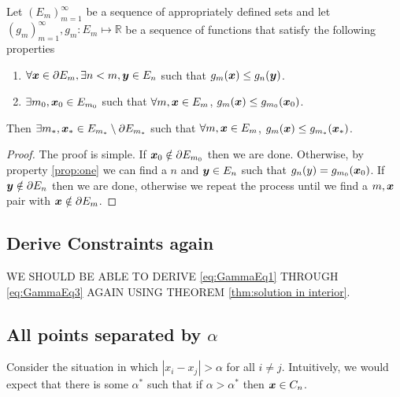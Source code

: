 		\begin{theorem}
			\label{thm:solution in interior}
			Let $(E_m)_{m=1}^\infty$ be a sequence of appropriately defined sets and let
			$(g_m)_{m=1}^\infty, g_m: E_m \mapsto \mathbb{R}$ be a sequence of
			functions that satisfy the following properties
			\begin{enumerate}
				\item $\forall {\bm{{x}}} \in \partial E_m, \exists n < m, {\bm{{y}}} \in E_n$ such that
				$g_m({\bm{{x}}}) \leq g_n({\bm{{y}}})$.
				\label{prop:one}
				\item $\exists m_0, {\bm{{x}}}_0 \in E_{m_0}$ such that $\forall m, {\bm{{x}}} \in 
				E_m$, $g_m({\bm{{x}}}) \leq g_{m_0}({\bm{{x}}}_0)$.
			\end{enumerate}
			Then $\exists m_*, {\bm{{x}}}_* \in E_{m_*} \setminus \partial E_{m_*}$ such
			that $\forall m, {\bm{{x}}} \in E_m$, $g_m({\bm{{x}}}) \leq g_{m_*}({\bm{{x}}}_*)$.
		\end{theorem}
		\begin{proof}
			The proof is simple. If ${\bm{{x}}}_0 \notin \partial E_{m_0}$ then we are done.
			Otherwise, by property \ref{prop:one} we can find a $n$ and ${\bm{{y}}} \in 
			E_n$ such that $g_n(y) = g_{m_0}({\bm{{x}}}_0)$. If ${\bm{{y}}} \notin \partial 
			E_n$ then we are done, otherwise we repeat the process until we find a $m, 
			{\bm{{x}}}$ pair with ${\bm{{x}}} \notin \partial E_m$. %
		\end{proof}

	\subsection{Derive Constraints again}
	WE SHOULD BE ABLE TO DERIVE \eqref{eq:GammaEq1} THROUGH \eqref{eq:GammaEq3} AGAIN USING THEOREM \ref{thm:solution in interior}.

	\subsection{All points separated by \texorpdfstring{$\alpha$}{a}}
		Consider the situation in which $|x_i - x_j| > \alpha$ for all $i\neq j$. Intuitively, we would expect that there is some $\alpha^*$ such that if $\alpha > \alpha^*$ then ${\bm{{x}}} \in C_n$.
		
